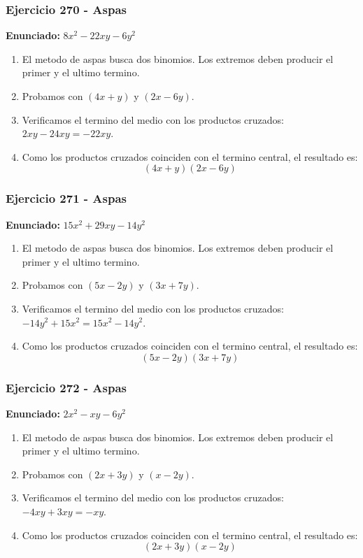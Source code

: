\documentclass[11pt,a4paper]{article}
\begin{document}
\vspace{0.2cm}
\subsubsection*{Ejercicio 270 - Aspas}
\textbf{Enunciado:} $ 8 x^{2} - 22 x y - 6 y^{2} $\par
\begin{enumerate}[leftmargin=2em]
\item El metodo de aspas busca dos binomios. Los extremos deben producir el primer y el ultimo termino.
\item Probamos con \((4 x + y)\) y \((2 x - 6 y)\).
\item Verificamos el termino del medio con los productos cruzados: \(2 x y- 24 x y=- 22 x y\).
\item Como los productos cruzados coinciden con el termino central, el resultado es: \[\boxed{\left(4 x + y\right)\left(2 x - 6 y\right)}\]
\end{enumerate}

\vspace{0.2cm}
\subsubsection*{Ejercicio 271 - Aspas}
\textbf{Enunciado:} $ 15 x^{2} + 29 x y - 14 y^{2} $\par
\begin{enumerate}[leftmargin=2em]
\item El metodo de aspas busca dos binomios. Los extremos deben producir el primer y el ultimo termino.
\item Probamos con \((5 x - 2 y)\) y \((3 x + 7 y)\).
\item Verificamos el termino del medio con los productos cruzados: \(- 14 y^{2}+15 x^{2}=15 x^{2} - 14 y^{2}\).
\item Como los productos cruzados coinciden con el termino central, el resultado es: \[\boxed{\left(5 x - 2 y\right)\left(3 x + 7 y\right)}\]
\end{enumerate}

\vspace{0.2cm}
\subsubsection*{Ejercicio 272 - Aspas}
\textbf{Enunciado:} $ 2 x^{2} - x y - 6 y^{2} $\par
\begin{enumerate}[leftmargin=2em]
\item El metodo de aspas busca dos binomios. Los extremos deben producir el primer y el ultimo termino.
\item Probamos con \((2 x + 3 y)\) y \((x - 2 y)\).
\item Verificamos el termino del medio con los productos cruzados: \(- 4 x y+3 x y=- x y\).
\item Como los productos cruzados coinciden con el termino central, el resultado es: \[\boxed{\left(2 x + 3 y\right)\left(x - 2 y\right)}\]
\end{enumerate}
\end{document}
